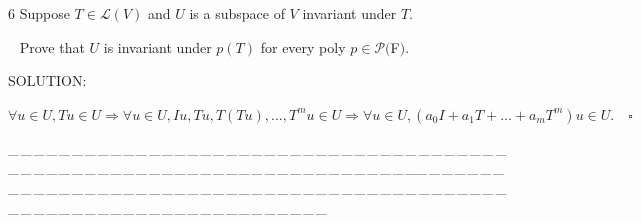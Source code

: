 \documentclass[a4paper, 11pt, UTF8]{article}
\def\Lm{\mathcal{L}}
\def\Po{\mathcal{P}}
\begin{document}
\begin{large}
{\timesbf\Large 6} {\timessl\Large 
Suppose $T\in\Lm(V)$ and $U$ is a subspace of $V$ invariant under $T$.}\par\,\,\,
{\timessl\Large Prove that $U$ is invariant under $p(T)$ for every poly $p\in\Po(${\timesbf F}$)$.
}\par
{\timesbf S\footnotesize{OLUTION:}}\par\quad
$\forall u\in U,Tu\in U\Rightarrow \forall u\in U,Iu,Tu,T(Tu),\dots,T^m u\in U\Rightarrow\forall u\in U,(a_0 I+a_1 T+\dots+a_m T^m)u\in U.\quad\square$
\par
{\tiny \_\,\_\,\_\,\_\,\_\,\_\,\_\,\_\,\_\,\_\,\_\,\_\,\_\,\_\,\_\,\_\,\_\,\_\,\_\,\_\,\_\,\_\,\_\,\_\,\_\,\_\,\_\,\_\,\_\,\_\,\_\,\_\,\_\,\_\,\_\,\_\,\_\,\_\,\_\,\_\,\_\,\_\,\_\,\_\,\_\,\_\,\_\,\_\,\_\,\_\,\_\,\_\,\_\,\_\,\_\,\_\,\_\,\_\,\_\,\_\,\_\,\_\,\_\,\_\,\_\,\_\,\_\,\_\,\_\,\_\,\_\_\,\_\,\_\,\_\,\_\,\_\,\_\,\_\,\_\,\_\,\_\,\_\,\_\,\_\,\_\,\_\,\_\,\_\,\_\,\_\,\_\,\_\,\_\,\_\,\_\,\_\,\_\,\_\,\_\,\_\,\_\,\_\,\_\,\_\,\_\,\_\,\_\,\_\,\_\,\_\,\_\,\_\,\_\,\_\,\_\,\_\,\_\,\_\,\_\,\_\,\_\,\_\,\_\,\_\,\_\,\_\,\_\,\_\,\_\,\_\,\_\,\_\,\_\,\_\,\_\,\_\,\_\,\_\,\_\,\_\,\_}\par


\end{large}
\end{document}
